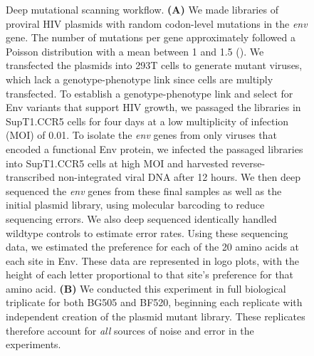 \documentclass[9pt]{elife}
\begin{document}
\begin{figure}
\caption{\label{fig:dms_schematic}
Deep mutational scanning workflow.
{\bf (A)} We made libraries of proviral HIV plasmids with random codon-level mutations in the \textit{env} gene.
The number of mutations per gene approximately followed a Poisson distribution with a mean between 1 and 1.5 ().
We transfected the plasmids into 293T cells to generate mutant viruses, which lack a genotype-phenotype link since cells are multiply transfected.
To establish a genotype-phenotype link and select for Env variants that support HIV growth, we passaged the libraries in SupT1.CCR5 cells for four days at a low multiplicity of infection (MOI) of 0.01.
To isolate the \textit{env} genes from only viruses that encoded a functional Env protein, we infected the passaged libraries into SupT1.CCR5 cells at high MOI and harvested reverse-transcribed non-integrated viral DNA after 12 hours.
We then deep sequenced the \textit{env} genes from these final samples as well as the initial plasmid library, using molecular barcoding to reduce sequencing errors.
We also deep sequenced identically handled wildtype controls to estimate error rates.
Using these sequencing data, we estimated the preference for each of the 20 amino acids at each site in Env.
These data are represented in logo plots, with the height of each letter proportional to that site's preference for that amino acid.
{\bf (B)} We conducted this experiment in full biological triplicate for both BG505 and BF520, beginning each replicate with independent creation of the plasmid mutant library.
These replicates therefore account for \emph{all} sources of noise and error in the experiments.
}
\end{figure}
\end{document}
